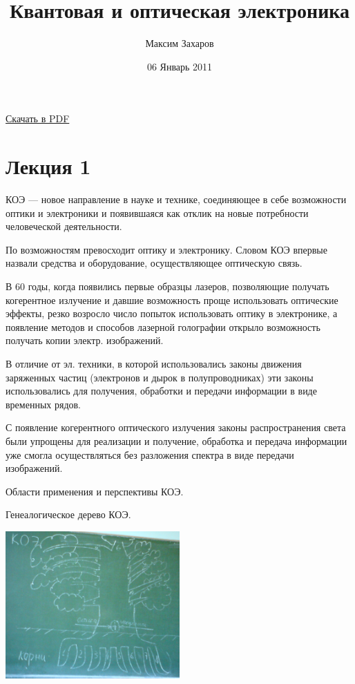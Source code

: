 \documentclass[12pt, russian, oneside, article]{ncc}
\begin{document}
\title{Квантовая и оптическая электроника}
\author{Максим Захаров}
\date{06 Январь 2011}
\maketitle

\setcounter{tocdepth}{3}
\tableofcontents
\vspace*{1cm}


\href{file:///home/maxim/Documents/Git/lectures/other/KOE_Lectures.pdf}{Скачать в PDF}

\section{Лекция 1}
\label{sec-1}


КОЭ --- новое направление в науке и технике, соединяющее в себе возможности оптики и электроники и появившаяся как отклик на новые потребности человеческой деятельности.

По возможностям превосходит оптику и электронику. Словом КОЭ впервые назвали средства и оборудование, осуществляющее оптическую связь.

В 60 годы, когда появились первые образцы лазеров, позволяющие получать когерентное излучение и давшие возможность проще использовать оптические эффекты, резко возросло число попыток использовать оптику в электронике, а появление методов и способов лазерной голографии открыло возможность получать копии электр. изображений.

В отличие от эл. техники, в которой использовались законы движения заряженных частиц (электронов и дырок в полупроводниках) эти законы использовались для получения, обработки и передачи информации в виде временных рядов.

С появление когерентного оптического излучения законы распространения света были упрощены для реализации и получение, обработка и передача информации уже смогла осуществляться без разложения спектра в виде передачи изображений.

Области применения и перспективы КОЭ. 

Генеалогическое дерево КОЭ.

\includegraphics[width=0.5\textwidth]{images/KOE/tree.png}
\end{document}
